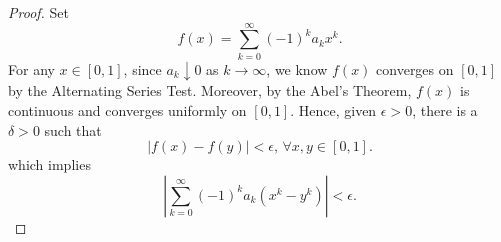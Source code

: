 \begin{Exercise}
\begin{proof}
Set $$f(x) = \sum_{k=0}^{\infty}(-1)^k a_k x^k.$$ For any $x\in[0,1]$, since $a_k \downarrow 0$ as $k\to\infty$, we know $f(x)$ converges on $[0,1]$ by the Alternating Series Test. Moreover, by the Abel's Theorem, $f(x)$ is continuous and converges uniformly on $[0,1]$. Hence, given $\epsilon >0$, there is a $\delta>0$ such that $$\left| f(x) - f(y) \right| < \epsilon\mbox{, } \forall x,y\in[0,1].$$ which implies $$\left| \sum_{k=0}^{\infty}(-1)^k a_k (x^k - y^k) \right| < \epsilon.$$
\end{proof}
\end{Exercise}